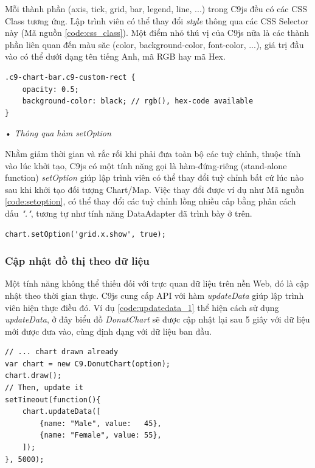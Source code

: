 \documentclass[12pt,a4paper]{article}
\begin{document}
\begin{list}{}{}
Mỗi thành phần (axis, tick, grid, bar, legend, line, ...) trong C9js đều có các CSS Class\citep{css_class} tương ứng. Lập trình viên có thể thay đổi \textit{style} thông qua các CSS Selector này (Mã nguồn \ref{code:css_class}). Một điểm nhỏ thú vị của C9js nữa là các thành phần liên quan đến màu săc (color, background-color, font-color, ...), giá trị đầu vào có thể dưới dạng tên tiếng Anh, mã RGB hay mã Hex.

\begin{lstlisting}[caption=Thay đổi \textit{style} bằng CSS Selector, label={code:css_class}]
.c9-chart-bar.c9-custom-rect {
    opacity: 0.5;
    background-color: black; // rgb(), hex-code available
}
\end{lstlisting}

\item[•] \emph{Thông qua hàm \textit{setOption}}

Nhằm giảm thời gian và rắc rối khi phải đưa toàn bộ các tuỳ chỉnh, thuộc tính vào lúc khởi tạo, C9js có một tính năng gọi là hàm-đứng-riêng (stand-alone function) \textit{setOption} giúp lập trình viên có thể thay đổi tuỳ chỉnh bất cứ lúc nào sau khi khởi tạo đối tượng Chart/Map. Việc thay đổi được ví dụ như Mã nguồn \ref{code:setoption}, có thể thay đổi các tuỳ chỉnh lồng nhiều cấp bằng phân cách dấu \textit{"."}, tương tự như tính năng DataAdapter đã trình bày ở trên.

\begin{lstlisting}[caption=Thay đổi \textit{style} với \textit{setOption}, label={code:setoption}]
chart.setOption('grid.x.show', true);
\end{lstlisting}

\end{list}

\subsubsection{Cập nhật đồ thị theo dữ liệu}
Một tính năng không thể thiếu đối với trực quan dữ liệu trên nền Web, đó là cập nhật theo thời gian thực. C9js cung cấp API với hàm \textit{updateData} giúp lập trình viên hiện thực điều đó. Ví dụ \ref{code:updatedata_1} thể hiện cách sử dụng \textit{updateData}, ở đây biểu đồ \textit{DonutChart} sẽ được cập nhật lại sau 5 giây với dữ liệu mới được đưa vào, cùng định dạng với dữ liệu ban đầu.

\begin{lstlisting}[caption=Cập nhật lại biểu đồ với \textit{updateData}, label={code:updatedata_1}]
// ... chart drawn already
var chart = new C9.DonutChart(option);
chart.draw();
// Then, update it
setTimeout(function(){
    chart.updateData([
        {name: "Male", value:   45},
        {name: "Female", value: 55},
    ]);
}, 5000);
\end{lstlisting}
\end{document}
